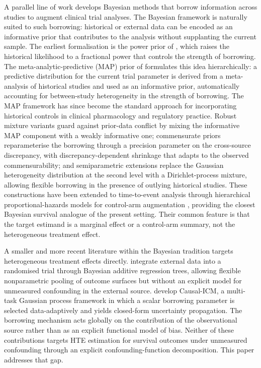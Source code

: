 A parallel line of work develops Bayesian methods that borrow information across studies to augment clinical trial analyses.
The Bayesian framework is naturally suited to such borrowing: historical or external data can be encoded as an informative prior that contributes to the analysis without supplanting the current sample.
The earliest formalisation is the power prior of \citet{ibrahim2000power}, which raises the historical likelihood to a fractional power that controls the strength of borrowing.
The meta-analytic-predictive (MAP) prior of \citet{neuenschwander2010} formulates this idea hierarchically: a predictive distribution for the current trial parameter is derived from a meta-analysis of historical studies and used as an informative prior, automatically accounting for between-study heterogeneity in the strength of borrowing.
The MAP framework has since become the standard approach for incorporating historical controls in clinical pharmacology and regulatory practice.
Robust mixture variants \citep{schmidli2014robust} guard against prior-data conflict by mixing the informative MAP component with a weakly informative one; commensurate priors \citep{hobbs2011,hobbs2012commensurate} reparameterise the borrowing through a precision parameter on the cross-source discrepancy, with discrepancy-dependent shrinkage that adapts to the observed commensurability; and semiparametric extensions \citep{hupf2021bayesian} replace the Gaussian heterogeneity distribution at the second level with a Dirichlet-process mixture, allowing flexible borrowing in the presence of outlying historical studies.
These constructions have been extended to time-to-event analysis through hierarchical proportional-hazards models for control-arm augmentation \citep{alt2025control}, providing the closest Bayesian survival analogue of the present setting.
Their common feature is that the target estimand is a marginal effect or a control-arm summary, not the heterogeneous treatment effect.

A smaller and more recent literature within the Bayesian tradition targets heterogeneous treatment effects directly.
\citet{zhou2021incorporating} integrate external data into a randomised trial through Bayesian additive regression trees, allowing flexible nonparametric pooling of outcome surfaces but without an explicit model for unmeasured confounding in the external source.
\citet{dimitriou2025causal} develop Causal-ICM, a multi-task Gaussian process framework in which a scalar borrowing parameter is selected data-adaptively and yields closed-form uncertainty propagation.
The borrowing mechanism acts globally on the contribution of the observational source rather than as an explicit functional model of bias.
Neither of these contributions targets HTE estimation for survival outcomes under unmeasured confounding through an explicit confounding-function decomposition.
This paper addresses that gap.



